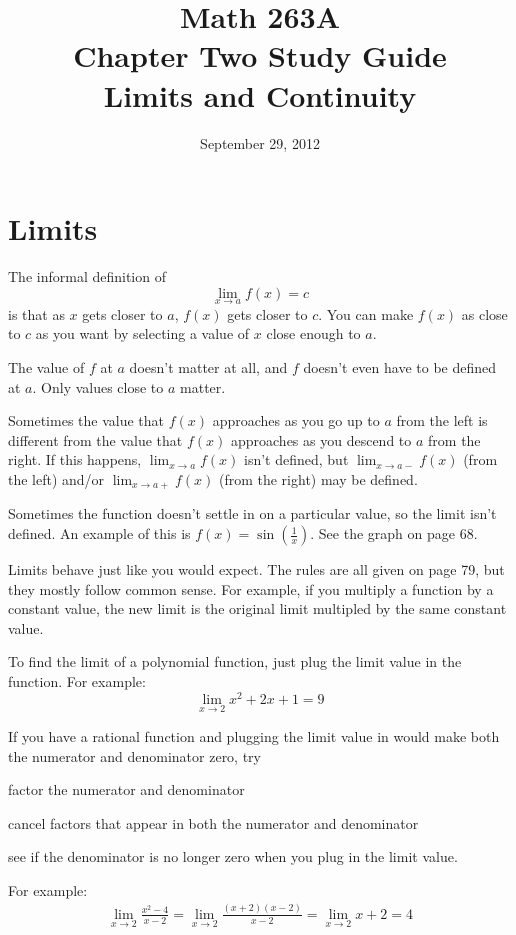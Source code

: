 \documentclass[fleqn]{exam}
\title{Math 263A \\ Chapter Two Study Guide \\ Limits and Continuity}
\date{September 29, 2012}
\author{}
\begin{document}
\maketitle  


\section{Limits}

The informal definition of
\[
  \lim_{x \to a} f(x) = c
\]
is that as $x$ gets closer to $a$, $f(x)$ gets closer to $c$.  You can make $f(x)$ as close to $c$ as you want by
selecting a value of $x$ close enough to $a$.

The value of $f$ at $a$ doesn't matter at all, and $f$ doesn't even have to be defined at $a$.  Only values close to $a$
matter.

Sometimes the value that $f(x)$ approaches as you go up to $a$ from the left is different from the value that $f(x)$
approaches as you descend to $a$ from the right.  If this happens, $\lim_{x \to a} f(x)$ isn't defined, but 
$\lim_{x \to a-} f(x)$ (from the left) and/or $\lim_{x \to a+} f(x)$ (from the right) may be defined.

Sometimes the function doesn't settle in on a particular value, so the limit isn't defined.  An example of this is 
$f(x) = \sin \left( \frac{1}{x} \right)$.  See the graph on page 68.

Limits behave just like you would expect.  The rules are all given on page 79, but they mostly follow common sense.  For
example, if you multiply a function by a constant value, the new limit is the original limit multipled by the same
constant value.

To find the limit of a polynomial function, just plug the limit value in the function.  For example:
\[
  \lim_{x \to 2} x^2 + 2x + 1 = 9
\]

If you have a rational function and plugging the limit value in would make both the numerator and denominator zero, try
\begin{itemize*}
  \item factor the numerator and denominator
  \item cancel factors that appear in both the numerator and denominator
  \item see if the denominator is no longer zero when you plug in the limit value. 
\end{itemize*}

For example:
\begin{align*}
  \lim_{x \to 2} \frac{x^2 - 4}{x - 2} = \lim_{x \to 2} \frac{(x + 2)(x - 2)}{x - 2} = \lim_{x \to 2} x + 2 = 4
\end{align*}
\end{document}
